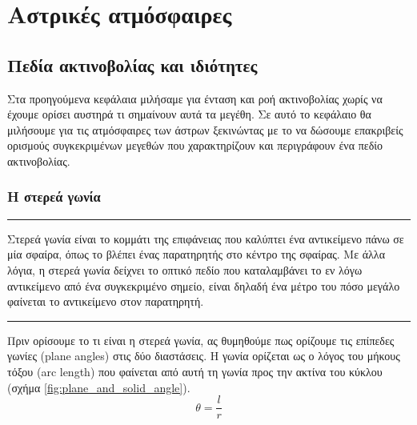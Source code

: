 \chapter{Αστρικές ατμόσφαιρες}
\label{ch:Chapter4}

\section{Πεδία ακτινοβολίας και ιδιότητες}
Στα προηγούμενα κεφάλαια μιλήσαμε για ένταση και ροή ακτινοβολίας χωρίς να έχουμε ορίσει αυστηρά τι σημαίνουν αυτά τα μεγέθη. Σε αυτό το κεφάλαιο θα μιλήσουμε για τις ατμόσφαιρες των άστρων ξεκινώντας με το να δώσουμε επακριβείς ορισμούς συγκεκριμένων μεγεθών που χαρακτηρίζουν και περιγράφουν ένα πεδίο ακτινοβολίας.

\subsection{Η στερεά γωνία}
{\color{red} \hrule}
Στερεά γωνία είναι το κομμάτι της επιφάνειας που καλύπτει ένα αντικείμενο πάνω σε μία σφαίρα, όπως το βλέπει ένας παρατηρητής στο κέντρο της σφαίρας. Με άλλα λόγια, η στερεά γωνία δείχνει το οπτικό πεδίο που καταλαμβάνει το εν λόγω αντικείμενο από ένα συγκεκριμένο σημείο, είναι δηλαδή ένα μέτρο του πόσο μεγάλο φαίνεται το αντικείμενο στον παρατηρητή.\\
 {\color{red} \hrule}
Πριν ορίσουμε το τι είναι η στερεά γωνία, ας θυμηθούμε πως ορίζουμε τις επίπεδες γωνίες (plane angles) στις δύο διαστάσεις. Η γωνία ορίζεται ως ο λόγος του μήκους τόξου (arc length) που φαίνεται από αυτή τη γωνία προς την ακτίνα του κύκλου (σχήμα \ref{fig:plane_and_solid_angle}). 
\begin{equation}
\label{eq:plane_angle}
    \theta = \frac{l}{r}
\end{equation}

